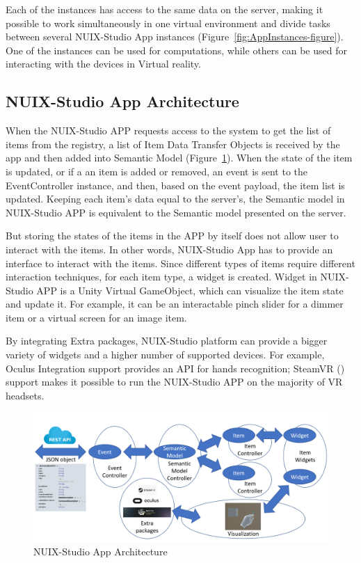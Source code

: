 Each of the instances has access to the same data on the server, making it possible to work simultaneously in one virtual environment and divide tasks between several NUIX-Studio App instances (Figure~\ref{fig:AppInstances-figure}). One of the instances can be used for computations, while others can be used for interacting with the devices in Virtual reality.

\subsection{NUIX-Studio App Architecture}

When the NUIX-Studio APP requests access to the system to get the list of items from the registry, a list of Item Data Transfer Objects is received by the app and then added into Semantic Model (Figure~\ref{fig:AppArchitecture-figure}). When the state of the item is updated, or if a an item is added or removed, an event is sent to the EventController instance, and then, based on the event payload, the item list is updated.  Keeping each item's data equal to the server's, the Semantic model in NUIX-Studio APP is equivalent to the Semantic model presented on the server. 

But storing the states of the items in the APP by itself does not allow user to interact with the items. In other words, NUIX-Studio App has to provide an interface to interact with the items. Since different types of items require different interaction techniques, for each item type, a widget is created.
Widget in NUIX-Studio APP is a Unity Virtual GameObject, which can visualize the item state and update it. For example, it can be an interactable pinch slider for a dimmer item or a virtual screen for an image item.

By integrating Extra packages, NUIX-Studio platform can provide a bigger variety of widgets and a higher number of supported devices. For example, Oculus Integration support provides an API for hands recognition; SteamVR (\cite{SteamVR2021}) support makes it possible to run the NUIX-Studio APP on the majority of VR headsets.

\begin{figure}
  \centering
  \includegraphics[width=0.9\linewidth]{figures/AppArchitecture.png}
  \caption{NUIX-Studio App Architecture}
  \label{fig:AppArchitecture-figure}
\end{figure}

